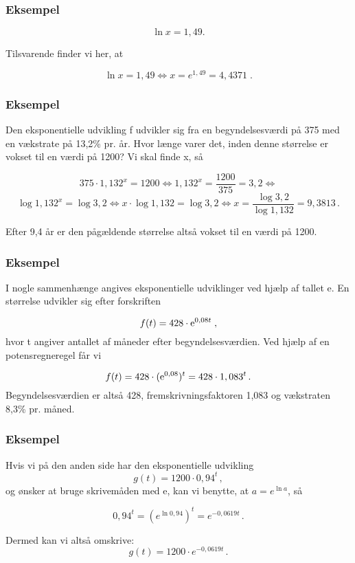 \documentclass[12pt,oneside,a4paper]{article}
\theoremstyle{plain}
\begin{document}
\begin{tcolorbox}
\subsubsection*{Eksempel}
\[
\ln x = 1,49.
\]

Tilsvarende finder vi her, at

\[
\ln x = 1,49 \iff x = e^{1,49} = 4,4371 \; .
\]
\end{tcolorbox}


\begin{tcolorbox}
\subsubsection*{Eksempel}
Den eksponentielle udvikling f udvikler sig fra en begyndelsesværdi på 375 med
en vækstrate på 13,2\% pr. år. Hvor længe varer det, inden denne størrelse er
vokset til en værdi på 1200? Vi skal finde x, så

\[
375 \cdot 1,132^x = 1200 \iff
    1,132^x = \frac{1200}{375} = 3,2 \iff
    \]
\[
    \log 1,132^x = \log 3,2 \iff
    x \cdot \log 1,132 = \log 3,2 \iff
    x = \frac{\log 3,2}{\log 1,132} = 9,3813\,.
\]

Efter 9,4 år er den pågældende størrelse altså vokset til en værdi på 1200.
\end{tcolorbox}


\begin{tcolorbox}
\subsubsection*{Eksempel}

    I nogle sammenhænge angives eksponentielle udviklinger ved hjælp af tallet {\rm e}.
En størrelse udvikler sig efter forskriften

\[
    f(t) = 428 \cdot {\rm e}^{0,08t} \; ,
\]
hvor t angiver antallet af måneder efter begyndelsesværdien. Ved hjælp af en
potensregneregel får vi

\[
    f(t) = 428 \cdot ({\rm e}^{0,08})^t = 428 \cdot 1,083^t \, .
\]
Begyndelsesværdien er altså 428, fremskrivningsfaktoren 1,083 og vækstraten
8,3\% pr. måned.
\end{tcolorbox}

\begin{tcolorbox}
\subsubsection*{Eksempel}
Hvis vi på den anden side har den eksponentielle udvikling 
\[
    g(t) = 1200 \cdot 0,94^t\,,
    \]
og ønsker at bruge skrivemåden med e, kan vi benytte, at  $a = e^{\ln a}$, så 

\[
0,94^t = (e^{\ln 0,94})^t = e^{-0,0619t} \, .
\]

Dermed kan vi altså omskrive:
\[
    g(t) = 1200 \cdot e^{-0,0619t} \, .
\]
\end{tcolorbox}
\end{document}
